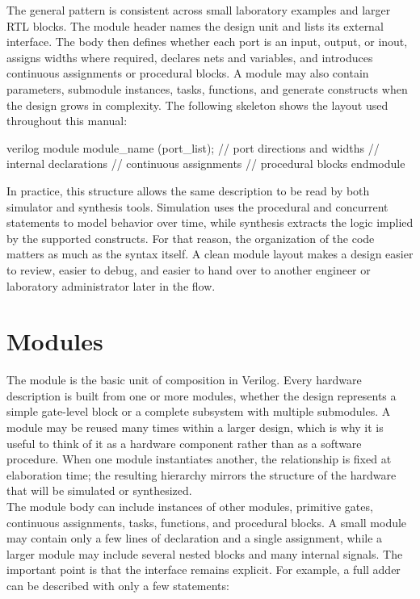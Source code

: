 \noindent The general pattern is consistent across small laboratory examples and larger RTL blocks.
The module header names the design unit and lists its external interface. The body then defines
whether each port is an input, output, or inout, assigns widths where required, declares nets and
variables, and introduces continuous assignments or procedural blocks. A module may also contain
parameters, submodule instances, tasks, functions, and generate constructs when the design grows in
complexity. The following skeleton shows the layout used throughout this manual:

\begin{codeblock}{verilog}
module module_name (port_list);
    // port directions and widths
    // internal declarations
    // continuous assignments
    // procedural blocks
endmodule
\end{codeblock}

\noindent In practice, this structure allows the same description to be read by both simulator and
synthesis tools. Simulation uses the procedural and concurrent statements to model behavior over
time, while synthesis extracts the logic implied by the supported constructs. For that reason, the
organization of the code matters as much as the syntax itself. A clean module layout makes a design
easier to review, easier to debug, and easier to hand over to another engineer or laboratory
administrator later in the flow.

\section{Modules}

The module is the basic unit of composition in Verilog. Every hardware description is built from one
or more modules, whether the design represents a simple gate-level block or a complete subsystem with
multiple submodules. A module may be reused many times within a larger design, which is why it is
useful to think of it as a hardware component rather than as a software procedure. When one module
instantiates another, the relationship is fixed at elaboration time; the resulting hierarchy mirrors
the structure of the hardware that will be simulated or synthesized.\\

\noindent The module body can include instances of other modules, primitive gates, continuous
assignments, tasks, functions, and procedural blocks. A small module may contain only a few lines of
declaration and a single assignment, while a larger module may include several nested blocks and many
internal signals. The important point is that the interface remains explicit. For example, a full
adder can be described with only a few statements:

